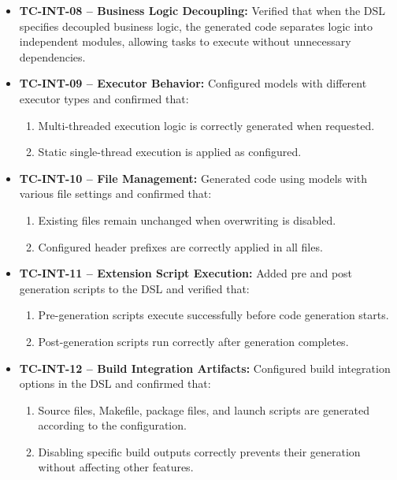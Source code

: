 \begin{itemize}
	\item \textbf{TC-INT-08 – Business Logic Decoupling:} Verified that when the DSL specifies decoupled business logic, the generated code separates logic into independent modules, allowing tasks to execute without unnecessary dependencies.
	
	\item \textbf{TC-INT-09 – Executor Behavior:} Configured models with different executor types and confirmed that:
	\begin{enumerate}
		\item Multi-threaded execution logic is correctly generated when requested.
		\item Static single-thread execution is applied as configured.
	\end{enumerate}
	
	\item \textbf{TC-INT-10 – File Management:} Generated code using models with various file settings and confirmed that:
	\begin{enumerate}
		\item Existing files remain unchanged when overwriting is disabled.
		\item Configured header prefixes are correctly applied in all files.
	\end{enumerate}
	
	\item \textbf{TC-INT-11 – Extension Script Execution:} Added pre and post generation scripts to the DSL and verified that:
	\begin{enumerate}
		\item Pre-generation scripts execute successfully before code generation starts.
		\item Post-generation scripts run correctly after generation completes.
	\end{enumerate}
	
	\item \textbf{TC-INT-12 – Build Integration Artifacts:} Configured build integration options in the DSL and confirmed that:
	\begin{enumerate}
		\item Source files, Makefile, package files, and launch scripts are generated according to the configuration.
		\item Disabling specific build outputs correctly prevents their generation without affecting other features.
	\end{enumerate}
	

\end{itemize}

